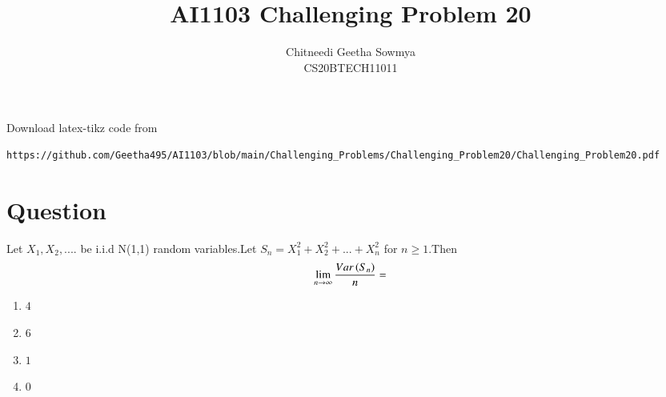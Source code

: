 \documentclass[journal,12pt,twocolumn]{IEEEtran}
\begin{document}
     \def\rightbox#1{\makebox[0in][r]{#1}}
     \def\centbox#1{\makebox[0in]{#1}}
     \def\topbox#1{\raisebox{-\baselineskip}[0in][0in]{#1}}
     \def\midbox#1{\raisebox{-0.5\baselineskip}[0in][0in]{#1}}
\vspace{3cm}
\title{AI1103 Challenging Problem 20}
\author{Chitneedi Geetha Sowmya \\ CS20BTECH11011}
\maketitle
\newpage
\bigskip
\renewcommand{\thefigure}{\theenumi}
\renewcommand{\thetable}{\theenumi}
\newcommand{\dsum}{\displaystyle\sum}
\newcommand{\R}{\mathbb{R}}
\newcommand{\C}{\mathbb{C}}
Download  latex-tikz code from 
%
\begin{lstlisting}
https://github.com/Geetha495/AI1103/blob/main/Challenging_Problems/Challenging_Problem20/Challenging_Problem20.pdf\end{lstlisting}

\section{Question}
Let $X_{1},X_{2},....$ be i.i.d N(1,1) random variables.Let $S_{n}=X_{1}^{2}+X_{2}^2+...+X_{n}^{2}$ for $n\ge1$.Then $$\lim_{n \to \infty}{\frac{Var\left(S_{n}\right)}{n}}=$$
\begin{enumerate}[label = (\Alph*)]
\item  $4$
\item  $6$
\item  $1$
\item  $0$
\end{enumerate}
\end{document}
